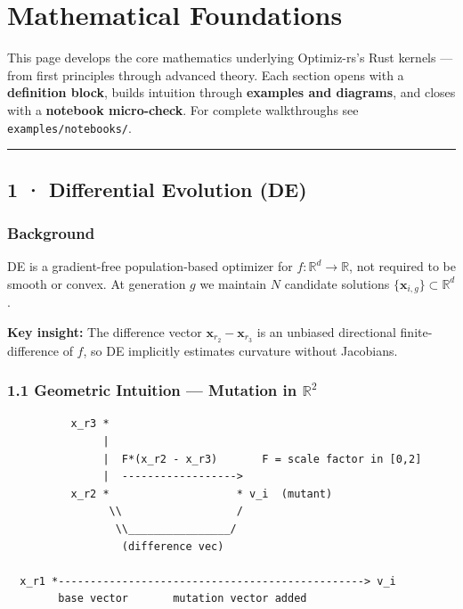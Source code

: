 \documentclass[11pt,a4paper]{article}
\begin{document}
\section{Mathematical Foundations}\label{mathematical-foundations}

This page develops the core mathematics underlying Optimiz-rs's Rust kernels --- from first principles through advanced theory. Each section opens with a \textbf{definition block}, builds intuition through \textbf{examples and diagrams}, and closes with a \textbf{notebook micro-check}. For complete walkthroughs see \texttt{examples/notebooks/}.

\begin{center}\rule{0.5\linewidth}{0.5pt}\end{center}

\subsection{1 · Differential Evolution (DE)}\label{differential-evolution-de}

\subsubsection{Background}\label{background}

DE is a gradient-free population-based optimizer for \(f: \mathbb{R}^d \to \mathbb{R}\), not required to be smooth or convex. At generation \(g\) we maintain \(N\) candidate solutions \(\{\mathbf{x}_{i,g}\} \subset \mathbb{R}^d\).

\textbf{Key insight:} The difference vector \(\mathbf{x}_{r_2}-\mathbf{x}_{r_3}\) is an unbiased directional finite-difference of \(f\), so DE implicitly estimates curvature without Jacobians.

\subsubsection{\texorpdfstring{1.1 Geometric Intuition --- Mutation in \(\mathbb{R}^2\)}{1.1 Geometric Intuition --- Mutation in \textbackslash mathbb\{R\}\^{}2}}\label{geometric-intuition-mutation-in-mathbbr2}

\begin{verbatim}
          x_r3 *
               |
               |  F*(x_r2 - x_r3)       F = scale factor in [0,2]
               |  ------------------>
          x_r2 *                    * v_i  (mutant)
                \\                  /
                 \\________________/
                  (difference vec)

  x_r1 *------------------------------------------------> v_i
        base vector       mutation vector added
\end{verbatim}
\end{document}
